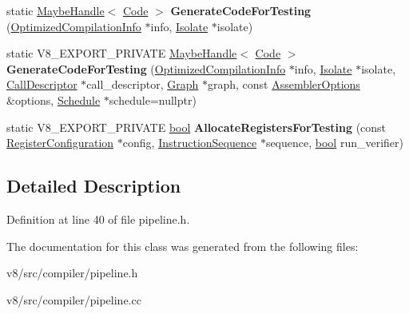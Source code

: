 \begin{DoxyCompactItemize}
\item 
\mbox{\label{classv8_1_1internal_1_1compiler_1_1Pipeline_a9c56edadb874e9d9755ff89a01cc43b1}} 
static \mbox{\hyperlink{classv8_1_1internal_1_1MaybeHandle}{Maybe\+Handle}}$<$ \mbox{\hyperlink{classv8_1_1internal_1_1Code}{Code}} $>$ {\bfseries Generate\+Code\+For\+Testing} (\mbox{\hyperlink{classv8_1_1internal_1_1OptimizedCompilationInfo}{Optimized\+Compilation\+Info}} $\ast$info, \mbox{\hyperlink{classv8_1_1internal_1_1Isolate}{Isolate}} $\ast$isolate)
\item 
\mbox{\label{classv8_1_1internal_1_1compiler_1_1Pipeline_ab848a901b8275cba006b1ef9ed41ed56}} 
static V8\+\_\+\+E\+X\+P\+O\+R\+T\+\_\+\+P\+R\+I\+V\+A\+TE \mbox{\hyperlink{classv8_1_1internal_1_1MaybeHandle}{Maybe\+Handle}}$<$ \mbox{\hyperlink{classv8_1_1internal_1_1Code}{Code}} $>$ {\bfseries Generate\+Code\+For\+Testing} (\mbox{\hyperlink{classv8_1_1internal_1_1OptimizedCompilationInfo}{Optimized\+Compilation\+Info}} $\ast$info, \mbox{\hyperlink{classv8_1_1internal_1_1Isolate}{Isolate}} $\ast$isolate, \mbox{\hyperlink{classv8_1_1internal_1_1compiler_1_1CallDescriptor}{Call\+Descriptor}} $\ast$call\+\_\+descriptor, \mbox{\hyperlink{classv8_1_1internal_1_1compiler_1_1Graph}{Graph}} $\ast$graph, const \mbox{\hyperlink{structv8_1_1internal_1_1AssemblerOptions}{Assembler\+Options}} \&options, \mbox{\hyperlink{classv8_1_1internal_1_1compiler_1_1Schedule}{Schedule}} $\ast$schedule=nullptr)
\item 
\mbox{\label{classv8_1_1internal_1_1compiler_1_1Pipeline_a55010c13df900af7da725dc7fbde4bc1}} 
static V8\+\_\+\+E\+X\+P\+O\+R\+T\+\_\+\+P\+R\+I\+V\+A\+TE \mbox{\hyperlink{classbool}{bool}} {\bfseries Allocate\+Registers\+For\+Testing} (const \mbox{\hyperlink{classv8_1_1internal_1_1RegisterConfiguration}{Register\+Configuration}} $\ast$config, \mbox{\hyperlink{classv8_1_1internal_1_1compiler_1_1InstructionSequence}{Instruction\+Sequence}} $\ast$sequence, \mbox{\hyperlink{classbool}{bool}} run\+\_\+verifier)
\end{DoxyCompactItemize}


\subsection{Detailed Description}


Definition at line 40 of file pipeline.\+h.



The documentation for this class was generated from the following files\+:\begin{DoxyCompactItemize}
\item 
v8/src/compiler/pipeline.\+h\item 
v8/src/compiler/pipeline.\+cc\end{DoxyCompactItemize}
